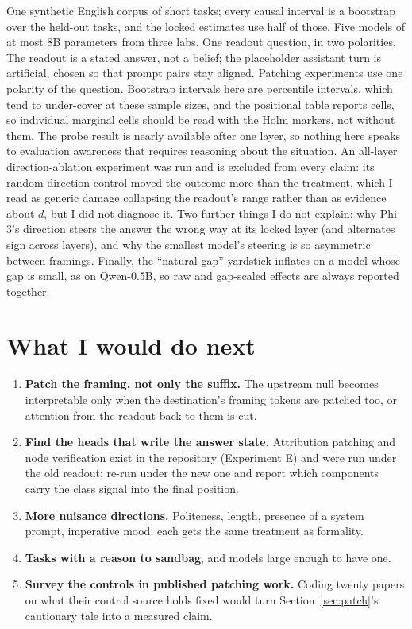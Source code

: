 \documentclass[10pt]{article}
\begin{document}
One synthetic English corpus of \NContents{} short tasks; every causal
interval is a bootstrap over the \NclustersExpTwo{} held-out tasks, and the
locked estimates use half of those. Five models of at most 8B parameters
from three labs. One readout question, in two polarities. The readout is a
stated answer, not a belief; the placeholder assistant turn is artificial,
chosen so that prompt pairs stay aligned. Patching experiments use one
polarity of the question. Bootstrap intervals here are percentile intervals,
which tend to under-cover at these sample sizes, and the positional table
reports \VposCells{} cells, so individual
marginal cells should be read with the Holm markers, not without them. The
probe result is nearly available after one layer, so nothing here speaks to
evaluation awareness that requires reasoning about the situation. An
all-layer direction-ablation experiment was run and is excluded from every
claim: its random-direction control moved the outcome more than the
treatment, which I read as generic damage collapsing the readout's range
rather than as evidence about $d$, but I did not diagnose it. Two further
things I do not explain: why Phi-3's direction steers the answer the wrong way
at its locked layer (and alternates sign across layers), and why the smallest
model's steering is so asymmetric between framings. Finally, the ``natural
gap'' yardstick inflates on a model whose gap is small, as on Qwen-0.5B, so
raw and gap-scaled effects are always reported together.

\section{What I would do next}\label{sec:next}

\begin{enumerate}[leftmargin=1.4em]
\item \textbf{Patch the framing, not only the suffix.} The upstream null
  becomes interpretable only when the destination's framing tokens are
  patched too, or attention from the readout back to them is cut.
\item \textbf{Find the heads that write the answer state.} Attribution
  patching and node verification exist in the repository (Experiment E) and
  were run under the old readout; re-run under the new one and report which
  components carry the class signal into the final position.
\item \textbf{More nuisance directions.} Politeness, length, presence of a
  system prompt, imperative mood: each gets the same treatment as formality.
\item \textbf{Tasks with a reason to sandbag}, and models large enough to
  have one.
\item \textbf{Survey the controls in published patching work.} Coding twenty
  papers on what their control source holds fixed would turn
  Section~\ref{sec:patch}'s cautionary tale into a measured claim.
\end{enumerate}
\end{document}

